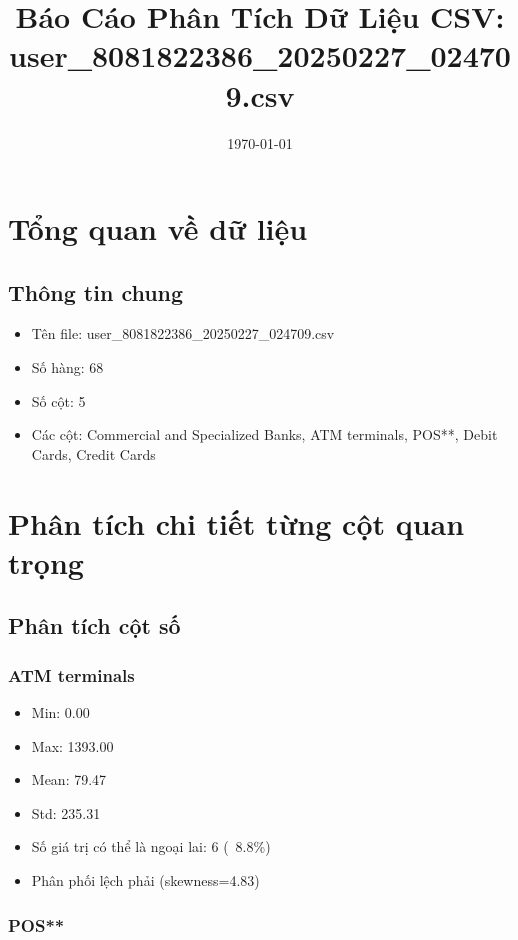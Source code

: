 \documentclass[12pt]{article}
\title{Báo Cáo Phân Tích Dữ Liệu CSV: user\_8081822386\_20250227\_024709.csv}
\author{}
\date{\today}
\begin{document}
\maketitle
\thispagestyle{empty}

\newpage
\tableofcontents
\newpage

\section{Tổng quan về dữ liệu}

\subsection{Thông tin chung}

\begin{itemize}
    \item Tên file: user\_8081822386\_20250227\_024709.csv
    \item Số hàng: 68
    \item Số cột: 5
    \item Các cột: Commercial and Specialized Banks, ATM terminals, POS**, Debit Cards, Credit Cards
\end{itemize}

\section{Phân tích chi tiết từng cột quan trọng}

\subsection{Phân tích cột số}

\subsubsection{ATM terminals}

\begin{itemize}
    \item Min: 0.00
    \item Max: 1393.00
    \item Mean: 79.47
    \item Std: 235.31
    \item Số giá trị có thể là ngoại lai: 6 (~8.8\%)
    \item Phân phối lệch phải (skewness=4.83)
\end{itemize}

\subsubsection{POS**}
\end{document}
